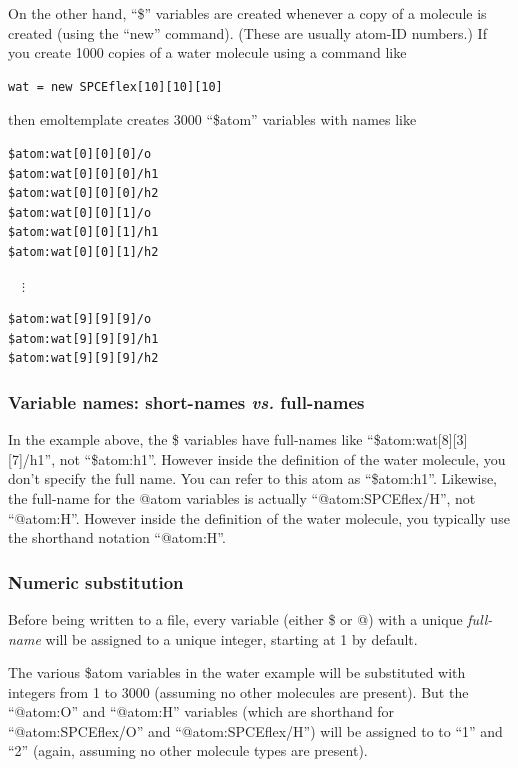 \documentclass[11pt]{article}
\begin{document}
On the other hand, ``\$'' variables are created whenever a copy 
of a molecule is created (using the ``new'' command).  
(These are usually atom-ID numbers.)
If you create 1000 copies of a water molecule using a command like 
\begin{verbatim}
wat = new SPCEflex[10][10][10]
\end{verbatim}
then emoltemplate creates 3000 ``\$atom'' variables with names like
\begin{verbatim}
$atom:wat[0][0][0]/o
$atom:wat[0][0][0]/h1
$atom:wat[0][0][0]/h2
$atom:wat[0][0][1]/o
$atom:wat[0][0][1]/h1
$atom:wat[0][0][1]/h2
\end{verbatim}
$\quad \vdots $
\begin{verbatim}
$atom:wat[9][9][9]/o
$atom:wat[9][9][9]/h1
$atom:wat[9][9][9]/h2
\end{verbatim}



\subsubsection{Variable names: short-names \textit{vs.} full-names}
\label{sec:full_names}

In the example above, the \$ variables have full-names like
``\$atom:wat[8][3][7]/h1'', not ``\$atom:h1''.  However inside the
definition of the water molecule, you don't specify the full name.
You can refer to this atom as ``\$atom:h1''.
Likewise, the full-name for the @atom variables is actually
``@atom:SPCEflex/H'', not ``@atom:H''. 
However inside the definition of the water molecule,
you typically use the shorthand notation ``@atom:H''.

\subsubsection{Numeric substitution}
Before being written to a file, every variable (either \$ or @) 
with a unique \textit{full-name} will be assigned to a unique integer, 
starting at 1 by default.

The various \$atom variables in the water example will be substituted 
with integers from 1 to 3000 (assuming no other molecules are present).
But the ``@atom:O'' and ``@atom:H'' variables
(which are shorthand for ``@atom:SPCEflex/O'' and ``@atom:SPCEflex/H'')
will be assigned to to ``1'' and ``2''
(again, assuming no other molecule types are present).
\end{document}
